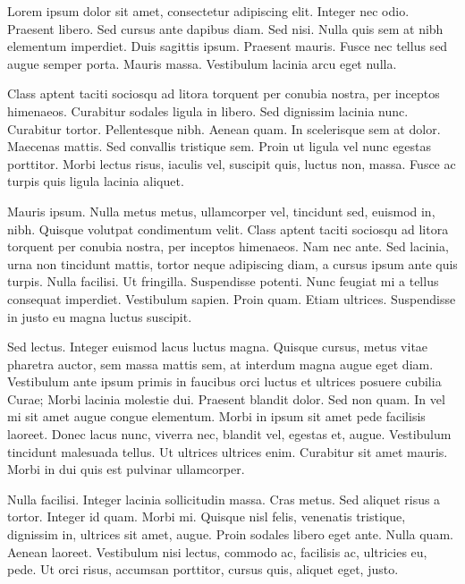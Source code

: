Lorem ipsum dolor sit amet, consectetur adipiscing elit. Integer nec
odio. Praesent libero. Sed cursus ante dapibus diam. Sed nisi. Nulla
quis sem at nibh elementum imperdiet. Duis sagittis ipsum. Praesent
mauris. Fusce nec tellus sed augue semper porta. Mauris massa.
Vestibulum lacinia arcu eget nulla.

Class aptent taciti sociosqu ad litora torquent per conubia nostra, per
inceptos himenaeos. Curabitur sodales ligula in libero. Sed dignissim
lacinia nunc. Curabitur tortor. Pellentesque nibh. Aenean quam. In
scelerisque sem at dolor. Maecenas mattis. Sed convallis tristique sem.
Proin ut ligula vel nunc egestas porttitor. Morbi lectus risus, iaculis
vel, suscipit quis, luctus non, massa. Fusce ac turpis quis ligula
lacinia aliquet.

Mauris ipsum. Nulla metus metus, ullamcorper vel, tincidunt sed, euismod
in, nibh. Quisque volutpat condimentum velit. Class aptent taciti
sociosqu ad litora torquent per conubia nostra, per inceptos himenaeos.
Nam nec ante. Sed lacinia, urna non tincidunt mattis, tortor neque
adipiscing diam, a cursus ipsum ante quis turpis. Nulla facilisi. Ut
fringilla. Suspendisse potenti. Nunc feugiat mi a tellus consequat
imperdiet. Vestibulum sapien. Proin quam. Etiam ultrices. Suspendisse in
justo eu magna luctus suscipit.

Sed lectus. Integer euismod lacus luctus magna. Quisque cursus, metus
vitae pharetra auctor, sem massa mattis sem, at interdum magna augue
eget diam. Vestibulum ante ipsum primis in faucibus orci luctus et
ultrices posuere cubilia Curae; Morbi lacinia molestie dui. Praesent
blandit dolor. Sed non quam. In vel mi sit amet augue congue elementum.
Morbi in ipsum sit amet pede facilisis laoreet. Donec lacus nunc,
viverra nec, blandit vel, egestas et, augue. Vestibulum tincidunt
malesuada tellus. Ut ultrices ultrices enim. Curabitur sit amet mauris.
Morbi in dui quis est pulvinar ullamcorper.

Nulla facilisi. Integer lacinia sollicitudin massa. Cras metus. Sed
aliquet risus a tortor. Integer id quam. Morbi mi. Quisque nisl felis,
venenatis tristique, dignissim in, ultrices sit amet, augue. Proin
sodales libero eget ante. Nulla quam. Aenean laoreet. Vestibulum nisi
lectus, commodo ac, facilisis ac, ultricies eu, pede. Ut orci risus,
accumsan porttitor, cursus quis, aliquet eget, justo.
